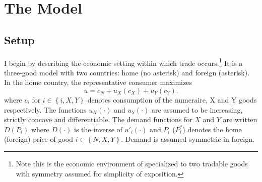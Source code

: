 \documentclass[12pt]{article}
\begin{document}
\section{The Model}
\label{sec:stage}

\subsection{Setup}
\label{sec:economic}
I begin by describing the economic setting within which trade occurs.\footnote{Note this is the economic environment of \Textcite{gh95} specialized to two tradable goods with symmetry assumed for simplicity of exposition.} It is a three-good model with two countries: home (no asterisk) and foreign (asterisk). In the home country, the representative consumer maximizes
\[
  u = c_N + u_X(c_X) + u_Y(c_Y).
\]
where $c_i$ for $i \in \left\{i,X,Y\right\}$ denotes consumption of the numeraire, X and Y goods respectively. The functions $u_X(\cdot)$ and $u_Y(\cdot)$ are assumed to be increasing, strictly concave and differentiable. The demand functions for $X$ and $Y$ are written $D(P_i)$ where $D(\cdot)$ is the inverse of $u'_i(\cdot)$ and $P_i$ ($P_i^*$) denotes the home (foreign) price of good $i \in \left\{N,X,Y\right\}$. Demand is assumed symmetric in foreign.
\end{document}
